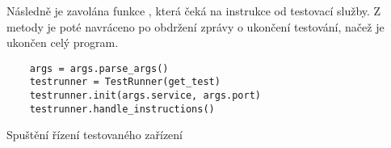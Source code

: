 Následně je zavolána funkce , která čeká na instrukce od testovací služby. Z metody je poté navráceno po obdržení zprávy o ukončení testování, načež je ukončen celý program. 


\begin{listing}[p]
    \centering
    \begin{verbatim}
    args = args.parse_args()
    testrunner = TestRunner(get_test)
    testrunner.init(args.service, args.port)
    testrunner.handle_instructions()
    \end{verbatim}
\caption{Spuštění řízení testovaného zařízení}
\label{listing:server_main}
\end{listing}


